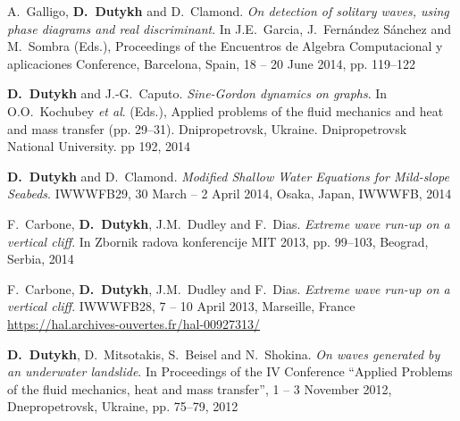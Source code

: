 \documentclass[final, a4paper, oneside, 12pt]{article}
\numberwithin{equation}{section}
\begin{document}
\begin{etaremune}

  
  \item A.~Galligo, \textbf{D.~Dutykh} and D.~Clamond. \textit{On detection of solitary waves, using phase diagrams and real discriminant}. In J.E.~Garcia, J.~Fern\'andez S\'anchez and M.~Sombra (Eds.), Proceedings of the Encuentros de Algebra Computacional y aplicaciones Conference, Barcelona, Spain, 18 -- 20 June 2014, pp. 119--122 %
  
  \item \textbf{D.~Dutykh} and J.-G.~Caputo. \textit{Sine-Gordon dynamics on graphs}. In O.O.~Kochubey \emph{et al}. (Eds.), Applied problems of the fluid mechanics and heat and mass transfer (pp. 29--31). Dnipropetrovsk, Ukraine. Dnipropetrovsk National University. pp 192, 2014 %
  
  \item \textbf{D.~Dutykh} and D.~Clamond. \textit{Modified Shallow Water Equations for Mild-slope Seabeds}. IWWWFB29, 30 March -- 2 April 2014, Osaka, Japan, IWWWFB, 2014 %
  
  \item F.~Carbone, \textbf{D.~Dutykh}, J.M.~Dudley and F.~Dias. \textit{Extreme wave run-up on a vertical cliff}. In Zbornik radova konferencije MIT 2013, pp. 99--103, Beograd, Serbia, 2014 %
  

  
  \item F.~Carbone, \textbf{D.~Dutykh}, J.M.~Dudley and F.~Dias. \textit{Extreme wave run-up on a vertical cliff}. IWWWFB28, 7 -- 10 April 2013, Marseille, France \\ %
  \url{https://hal.archives-ouvertes.fr/hal-00927313/}
  

  
  \item \textbf{D.~Dutykh}, D.~Mitsotakis, S.~Beisel and N.~Shokina. \textit{On waves generated by an underwater landslide}. In Proceedings of the IV Conference ``Applied Problems of the fluid mechanics, heat and mass transfer'', 1 -- 3 November 2012, Dnepropetrovsk, Ukraine, pp. 75--79, 2012 %
  

\end{etaremune}
\end{document}
